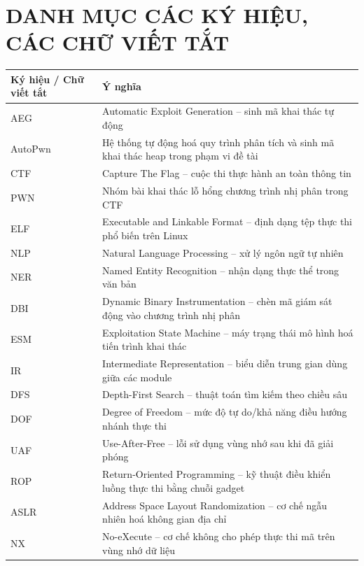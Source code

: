 \documentclass[final]{hcmuitthesis}
\begin{document}
\chapter*{DANH MỤC CÁC KÝ HIỆU, CÁC CHỮ VIẾT TẮT}

\begingroup
\small
\renewcommand{\arraystretch}{1.18}
\begin{longtable}{|p{3cm}|p{10.5cm}|}
\hline
\textbf{Ký hiệu / Chữ viết tắt} & \textbf{Ý nghĩa} \\ \hline
AEG & Automatic Exploit Generation -- sinh mã khai thác tự động \\ \hline
AutoPwn & Hệ thống tự động hoá quy trình phân tích và sinh mã khai thác heap trong phạm vi đề tài \\ \hline
CTF & Capture The Flag -- cuộc thi thực hành an toàn thông tin \\ \hline
PWN & Nhóm bài khai thác lỗ hổng chương trình nhị phân trong CTF \\ \hline
ELF & Executable and Linkable Format -- định dạng tệp thực thi phổ biến trên Linux \\ \hline
NLP & Natural Language Processing -- xử lý ngôn ngữ tự nhiên \\ \hline
NER & Named Entity Recognition -- nhận dạng thực thể trong văn bản \\ \hline
DBI & Dynamic Binary Instrumentation -- chèn mã giám sát động vào chương trình nhị phân \\ \hline
ESM & Exploitation State Machine -- máy trạng thái mô hình hoá tiến trình khai thác \\ \hline
IR & Intermediate Representation -- biểu diễn trung gian dùng giữa các module \\ \hline
DFS & Depth-First Search -- thuật toán tìm kiếm theo chiều sâu \\ \hline
DOF & Degree of Freedom -- mức độ tự do/khả năng điều hướng nhánh thực thi \\ \hline
UAF & Use-After-Free -- lỗi sử dụng vùng nhớ sau khi đã giải phóng \\ \hline
ROP & Return-Oriented Programming -- kỹ thuật điều khiển luồng thực thi bằng chuỗi gadget \\ \hline
ASLR & Address Space Layout Randomization -- cơ chế ngẫu nhiên hoá không gian địa chỉ \\ \hline
NX & No-eXecute -- cơ chế không cho phép thực thi mã trên vùng nhớ dữ liệu \\ \hline

\end{longtable}
\end{document}
